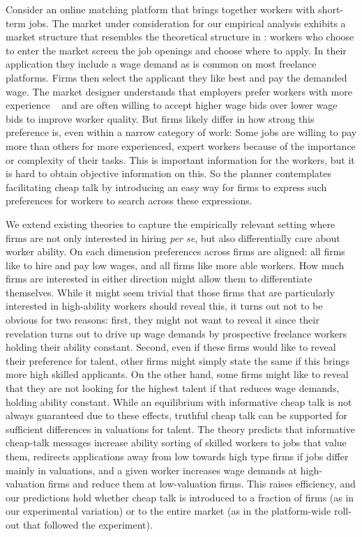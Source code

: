 \documentclass[12pt]{article}
\begin{document}
 Consider an online matching platform that brings together workers with short-term jobs. The market under consideration for our empirical analysis exhibits a market structure that resembles the theoretical structure in \cite{kimKircher2015}: workers who choose to enter the market screen the job openings and choose where to apply. In their application they include a wage demand as is common on most freelance platforms. Firms then select the applicant they like best and pay the demanded wage. The market designer understands that employers prefer workers with more experience ~\citep{pallais2010inefficient, stanton2011landing} and are often willing to accept higher wage bids over lower wage bids \citep{hortonVasserman2020} to improve worker quality. But firms likely differ in how strong this preference is, even within a narrow category of work:
Some jobs are willing to pay more than others for more experienced, expert workers because of the importance or complexity of their tasks. This is important information for the workers, but it is hard to obtain objective information on this. So the planner contemplates facilitating cheap talk by introducing an easy way for firms to express such preferences for workers to search across these expressions. 
 
 We extend existing theories to capture the empirically relevant setting where firms are not only interested in hiring \emph{per se}, but also differentially care about worker ability. On each dimension preferences across firms are aligned: all firms like to hire and pay low wages, and all firms like more able workers. How much firms are interested in either direction might allow them to differentiate themselves. While it might seem trivial that those firms that are particularly interested in high-ability workers should reveal this, it turns out not to be obvious for two reasons: first, they might not want to reveal it since their revelation turns out to drive up wage demands by prospective freelance workers holding their ability constant. Second, even if these firms would like to reveal their preference for talent, other firms might simply state the same if this brings more high skilled applicants. On the other hand, some firms might like to reveal that they are not looking for the highest talent if that reduces wage demands, holding ability constant. While an equilibrium with informative cheap talk is not always guaranteed due to these effects, truthful cheap talk can be supported for sufficient differences in valuations for talent. The theory predicts that informative cheap-talk messages increase ability sorting of skilled workers to jobs that value them, redirects applications away from low towards high type firms if jobs differ mainly in valuations, and a given worker increases wage demands at high-valuation firms and reduce them at low-valuation firms. This raises efficiency, and our predictions hold whether cheap talk is introduced to a fraction of firms (as in our experimental variation) or to the entire market (as in the platform-wide roll-out that followed the experiment). 
\end{document}
